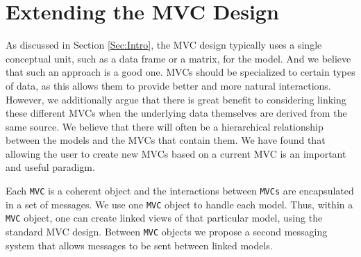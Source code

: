 \documentclass{article}[11pt]
\newcommand{\Robject}[1]{{\texttt{#1}}}
\begin{document}
\section{Extending the MVC Design}
\label{Sec:Extend}

As discussed in Section \ref{Sec:Intro}, the MVC design typically uses a single
conceptual unit, such as a data frame or a matrix, for the model.  And
we believe that such an approach is a good one.  MVCs should be
specialized to certain types of data, as this allows them to provide
better and more natural interactions.  However, we additionally argue
that there is great benefit to considering linking these different
MVCs when the underlying data themselves are derived from the same source.
We believe that there will often be a hierarchical relationship
between the models and the MVCs that contain them.  We have found
that allowing the user to create new MVCs based on a current MVC is an
important and useful paradigm.

Each \Robject{MVC} is a coherent object and the interactions between
\Robject{MVCs} are encapsulated in a set of messages.  We use one
\Robject{MVC} object to handle each model.  Thus, within a
\Robject{MVC} object, one can create linked views of that particular
model, using the standard MVC design.  Between \Robject{MVC}
objects we propose a second messaging system that allows messages to
be sent between linked models.


%
%
\end{document}
